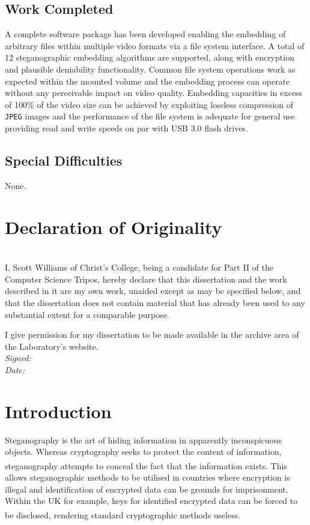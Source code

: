 \documentclass[paper=a4, fontsize=11pt,twoside]{scrartcl}
\numberwithin{table}{section}
\numberwithin{figure}{section}
\numberwithin{algorithm}{section}
\begin{document}
\subsection*{Work Completed}
A complete software package has been developed enabling the embedding of arbitrary files within multiple video formats via a file system interface. A total of 12 steganographic embedding algorithms are supported, along with encryption and plausible deniability functionality. Common file system operations work as expected within the mounted volume and the embedding process can operate without any perceivable impact on video quality. Embedding capacities in excess of 100\% of the video size can be achieved by exploiting lossless compression of \texttt{JPEG} images and the performance of the file system is adequate for general use providing read and write speeds on par with USB 3.0 flash drives.

\subsection*{Special Difficulties}
None.

\pagebreak
\section*{Declaration of Originality}
~\\[5pt]
I, Scott Williams of Christ's College, being a candidate for Part II of the Computer
Science Tripos, hereby declare that this dissertation and the work described
in it are my own work, unaided except as may be specified below, and that
the dissertation does not contain material that has already been used to any
substantial extent for a comparable purpose.

I give permission for my dissertation to be made available in the archive
area of the Laboratory's website.\\[20pt]
\textit{Signed:}\\[20pt]
\textit{Date:}
\clearpage

\tableofcontents
\vfill

\pagebreak
{} 
\section{Introduction}
Steganography is the art of hiding information in apparently inconspicuous objects. Whereas cryptography seeks to protect the content of information, steganography attempts to conceal the fact that the information exists\textsuperscript{\cite{digmedia}}. This allows steganographic methods to be utilised in countries where encryption is illegal and identification of encrypted data can be grounds for imprisonment. Within the UK for example, keys for identified encrypted data can be forced to be disclosed\textsuperscript{\cite{uklaw}}, rendering standard cryptographic methods useless.
\end{document}
